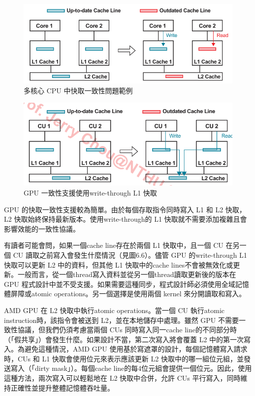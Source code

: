 \begin{figure}
    \centering
    \includegraphics[width=1\linewidth]{FileAusiliari//Screenshots/Figure6-6.png}
    \caption{多核心 CPU 中快取一致性問題範例}
    \label{fig:enter-label}
\end{figure}
\begin{figure}
    \centering
    \includegraphics[width=1\linewidth]{FileAusiliari//Screenshots/Figure6-7.png}
    \caption{GPU 一致性支援使用write-through L1 快取}
    \label{fig:enter-label}
\end{figure}

GPU 的快取一致性支援較為簡單。由於每個存取指令同時寫入 L1 和 L2 快取，L2 快取始終保持最新版本。使用write-through的 L1 快取就不需要添加複雜且會影響效能的一致性協議。

有讀者可能會問，如果一個cache line存在於兩個 L1 快取中，且一個 CU 在另一個 CU 讀取之前寫入會發生什麼情況（見圖6.6）。儘管 GPU 的write-through L1 快取可以更新 L2 中的資料，但其他 L1 快取中的cache lines不會被無效化或更新。一般而言，從一個thread寫入資料並從另一個thread讀取更新後的版本在 GPU 程式設計中並不受支援。如果需要這種同步，程式設計師必須使用全域記憶體屏障或atomic operations。另一個選擇是使用兩個 kernel 來分開讀取和寫入。

AMD GPU 在 L2 快取中執行atomic operations。當一個 CU 執行atomic instruction時，該指令會被送到 L2，並在本地儲存中處理。雖然 GPU 不需要一致性協議，但我們仍須考慮當兩個 CUs 同時寫入同一cache line的不同部分時（「假共享」）會發生什麼。如果設計不當，第二次寫入將會覆蓋 L2 中的第一次寫入。為避免這種情況，AMD GPU 使用基於寫遮罩的設計，每個記憶體寫入請求時，CUs 和 L1 快取會使用位元來表示應該更新 L2 快取中的哪一組位元組，並發送寫入（「dirty mask」）。每個cache line的每4位元組會提供一個位元。因此，使用這種方法，兩次寫入可以輕鬆地在 L2 快取中合併，允許 CUs 平行寫入，同時維持正確性並提升整體記憶體吞吐量。

